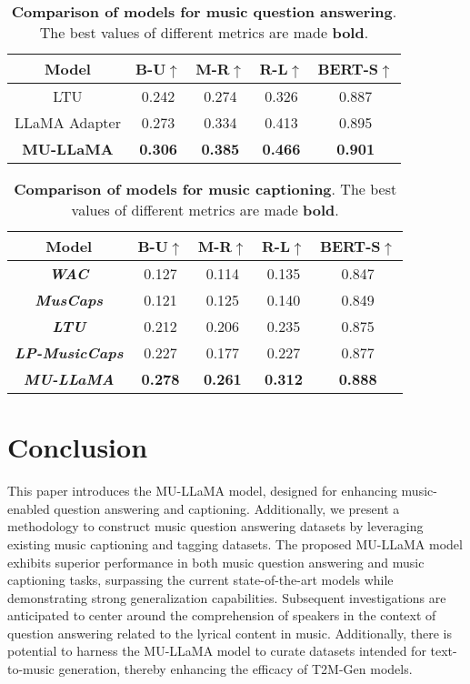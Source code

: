\documentclass{article}
\begin{document}
\begin{table}[ht!]
\centering
\def\arraystretch{1.1}\caption{\textbf{Comparison of models for music question answering}. The best values of different metrics are made \textbf{bold}.}
\begin{tabular}{c|c|c|c|c}
\hline\hline
Model & \textbf{B-U$\uparrow$} & \textbf{M-R$\uparrow$} & \textbf{R-L$\uparrow$} & \textbf{BERT-S$\uparrow$} \\ \hline\hline
LTU & 0.242 & 0.274 & 0.326 & 0.887 \\
LLaMA Adapter & 0.273 & 0.334 & 0.413 & 0.895 \\
\textbf{MU-LLaMA} & \textbf{0.306} & \textbf{0.385} & \textbf{0.466} & \textbf{0.901} \\ \hline\hline
\end{tabular}
\label{musicqa_eval}
\end{table}
\vspace{-4mm}

\begin{table}[ht!]
\centering
\def\arraystretch{1.1}\caption{\textbf{Comparison of models for music captioning}. The best values of different metrics are made \textbf{bold}.}
\begin{tabular}{c|c|c|c|c}
\hline\hline
Model & \textbf{B-U$\uparrow$} & \textbf{M-R$\uparrow$} & \textbf{R-L$\uparrow$} & \textbf{BERT-S$\uparrow$} \\ \hline\hline
\textit{\textbf{WAC}} & 0.127 & 0.114 & 0.135 & 0.847 \\
\textit{\textbf{MusCaps}} & 0.121 & 0.125 & 0.140 & 0.849 \\
\textit{\textbf{LTU}} & 0.212 & 0.206 & 0.235 & 0.875 \\
\textit{\textbf{LP-MusicCaps}} & 0.227 & 0.177 & 0.227 & 0.877 \\
\textit{\textbf{MU-LLaMA}} & \textbf{0.278} & \textbf{0.261} & \textbf{0.312} & \textbf{0.888}\\ \hline\hline
\end{tabular}
\label{musiccap_eval}
\end{table}

\vspace{-0.5cm}
\section{Conclusion}
\label{sec:conclusion}

This paper introduces the MU-LLaMA model, designed for enhancing music-enabled question answering and captioning. Additionally, we present a methodology to construct music question answering datasets by leveraging existing music captioning and tagging datasets. The proposed MU-LLaMA model exhibits superior performance in both music question answering and music captioning tasks, surpassing the current state-of-the-art models while demonstrating strong generalization capabilities. Subsequent investigations are anticipated to center around the comprehension of speakers in the context of question answering related to the lyrical content in music. Additionally, there is potential to harness the MU-LLaMA model to curate datasets intended for text-to-music generation, thereby enhancing the efficacy of T2M-Gen models.

\vfill\pagebreak





{\small
}
\end{document}
